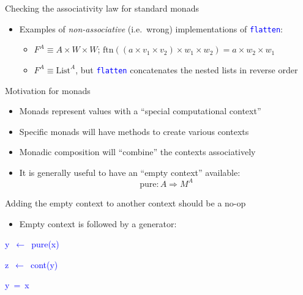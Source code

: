 \documentclass[english]{beamer}
\newenvironment{lyxcode}
   {\par\begin{list}{}{
     \setlength{\rightmargin}{\leftmargin}
     \setlength{\listparindent}{0pt}%
     \raggedright
     \setlength{\itemsep}{0pt}
     \setlength{\parsep}{0pt}
     \normalfont\ttfamily}%
    \def\{{\char`\{}
    \def\}{\char`\}}
    \def\textasciitilde{\char`\~}
    \item[]}
   {\end{list}}
\begin{document}
\begin{frame}{Checking the associativity law for standard monads}
\begin{itemize}
\begin{itemize}
\end{itemize}
\item Examples of \emph{non-associative} (i.e.\ wrong) implementations
of \texttt{\textcolor{blue}{\footnotesize{}flatten}}:
\begin{itemize}
\item $F^{A}\equiv A\times W\times W$; $\text{ftn}\left(\left(a\times v_{1}\times v_{2}\right)\times w_{1}\times w_{2}\right)=a\times w_{2}\times w_{1}$
\item $F^{A}\equiv\text{List}^{A}$, but \texttt{\textcolor{blue}{\footnotesize{}flatten}}
concatenates the nested lists in reverse order
\end{itemize}
\end{itemize}
\end{frame}

\begin{frame}{Motivation for monads}

\begin{itemize}
\item Monads represent values with a ``special computational context''
\item Specific monads will have methods to create various contexts
\item Monadic composition will ``combine'' the contexts associatively
\item It is generally useful to have an ``empty context'' available:
\[
\text{pure}:A\Rightarrow M^{A}
\]
\end{itemize}
Adding the empty context to another context should be a no-op
\begin{itemize}
\item Empty context is followed by a generator:
\end{itemize}
\texttt{\textcolor{blue}{\footnotesize{}}}%
\begin{minipage}[c][1\totalheight][t]{0.49\columnwidth}%
\begin{lyxcode}
\textcolor{blue}{\footnotesize{}y~$\leftarrow$~pure(x)}{\footnotesize \par}

\textcolor{blue}{\footnotesize{}z~$\leftarrow$~cont(y)}{\footnotesize \par}
\end{lyxcode}
%
\end{minipage}\texttt{\textcolor{blue}{\footnotesize{}\hfill{}}}%
\begin{minipage}[c][1\totalheight][t]{0.4\columnwidth}%
\begin{lyxcode}
\textcolor{blue}{\footnotesize{}y~=~x}{\footnotesize \par}


\end{lyxcode}
\end{minipage}
\end{frame}
\end{document}
